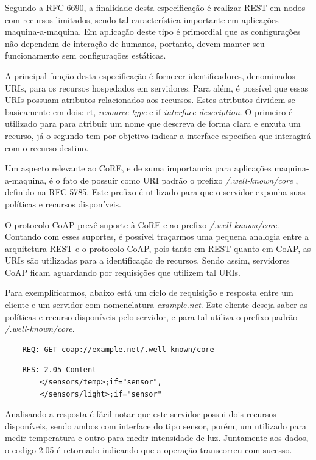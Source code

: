 Segundo a RFC-6690, a finalidade desta especificação é realizar REST em nodos com recursos limitados, sendo tal característica importante em aplicações maquina-a-maquina\cite{rfc6690}.
Em aplicação deste tipo é primordial que as configurações não dependam de interação de humanos, portanto, devem manter seu funcionamento sem configurações estáticas.


A principal função desta especificação é fornecer identificadores, denominados URIs, para os recursos hospedados em servidores. 
Para além, é possível que essas URIs possuam atributos relacionados aos recursos.
Estes atributos dividem-se basicamente em dois: rt, \textit{resource type} e if \textit{interface description}.
O primeiro é utilizado para para atribuir um nome que descreva de forma clara e enxuta um recurso,
já o segundo tem por objetivo indicar a interface especifica que interagirá com o recurso destino.

Um aspecto relevante ao CoRE, e de suma importancia para aplicações maquina-a-maquina, é o fato de possuir como URI padrão o prefixo \textit{/.well-known/core} , definido na RFC-5785\cite{rfc5785}.
Este prefixo é utilizado para que o servidor exponha suas políticas e recursos disponíveis.

O protocolo CoAP prevê suporte à CoRE e ao prefixo \textit{/.well-known/core}.
Contando com esses suportes, é possível traçarmos uma pequena analogia entre a arquitetura REST e o protocolo CoAP, pois tanto em REST quanto em CoAP, as URIs são utilizadas para a identificação de recursos.
Sendo assim, servidores CoAP ficam aguardando por requisições que utilizem tal URIs.

Para exemplificarmos, abaixo está um ciclo de requisição e resposta entre um cliente e um servidor com nomenclatura \textit{example.net}.
Este cliente deseja saber as políticas e recurso disponíveis pelo servidor, e para tal utiliza o prefixo padrão \textit{/.well-known/core}.

\begin{verbatim}
    REQ: GET coap://example.net/.well-known/core
\end{verbatim}

\begin{verbatim}
    RES: 2.05 Content
        </sensors/temp>;if="sensor",
        </sensors/light>;if="sensor"
\end{verbatim}


Analisando a resposta é fácil notar que este servidor possui dois recursos disponíveis,
sendo ambos com interface do tipo sensor, porém, um utilizado para medir temperatura e outro para medir intensidade de luz.
Juntamente aos dados, o codigo 2.05 é retornado indicando que a operação transcorreu com sucesso.

